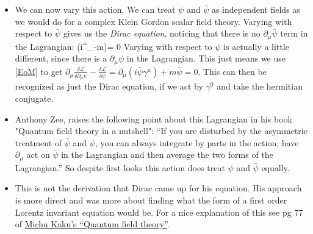 \documentclass[11pt]{article}
\renewenvironment{flalign}{\vspace{-2mm}\empheq[box=\tcbhighmath]{align}}{\endempheq}
\numberwithin{equation}{section}
\begin{document}
\begin{itemize}
  \item We can now vary this action. We can treat $\psi$ and $\bar{\psi}$ as independent fields as we would do for a complex Klein Gordon scalar field theory. Varying with respect to $\bar{\psi}$ gives us the \emph{Dirac equation}, noticing that there is no $\partial_{\mu}\bar{\psi}$ term in the Lagrangian:
  \begin{flalign}
  \label{Dirac}
      (i\gamma^{\mu}\partial_{\mu}-m)\psi = 0
    \end{flalign} 
    Varying with respect to $\psi$ is actually a little different, since there is a $\partial_{\mu}\psi$ in the Lagrangian. This just means we use \ref{EoM} to get $\partial_{\mu}\frac{\delta \mathcal{L}}{\delta \partial_{\mu} \psi}-\frac{\delta \mathcal{L}}{\delta \psi}  = \partial_{\mu}(i\bar{\psi}\gamma^{\mu})+m\bar{\psi}=0$. This can then be recognized as just the Dirac equation, if we act by $\gamma^{0}$ and take the hermitian conjugate. 

\item Anthony Zee, raises the following point about this Lagrangian in his book "Quantum field theory in a nutshell": ``If you are disturbed by the asymmetric treatment of $\bar{\psi}$ and $\psi$, you can always integrate by parts in the action, have $\partial_{\mu}$  act on $\bar{\psi}$ in the Lagrangian and then average the two forms of the Lagrangian.'' So despite first looks this action does treat $\psi$ and $\bar{\psi}$ equally. 

\item This is not the derivation that Dirac came up for his equation. His approach is more direct and was more about finding what the form of a first order Lorentz invariant equation would be. For a nice explanation of this see pg 77 of  \href{https://archive.org/details/quantumfieldtheo0000kaku}{Michu Kaku's ``Quantum field theory''}. 


\end{itemize}
\end{document}

